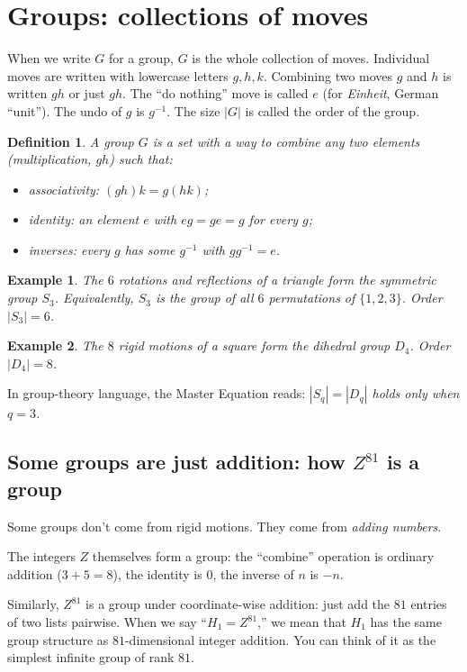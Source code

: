 \documentclass[11pt]{article}
\def\mathbb#1{#1}%
\def\textbf#1{#1}%
\def\cdot{ }%
\newtheorem*{definition}{Definition}
\newtheorem*{example}{Example}
\begin{document}
\section{Groups: collections of moves}

\begin{mathnote}
When we write $G$ for a group, $G$ is the whole collection of moves. Individual moves are written with lowercase letters $g, h, k$. Combining two moves $g$ and $h$ is written $g \cdot h$ or just $gh$. The ``do nothing'' move is called $e$ (for \emph{Einheit}, German ``unit''). The undo of $g$ is $g^{-1}$. The size $|G|$ is called the \textbf{order} of the group.
\end{mathnote}

\begin{definition}
A \textbf{group} $G$ is a set with a way to combine any two elements (multiplication, $gh$) such that:
\begin{itemize}[leftmargin=2em]
\item associativity: $(gh)k = g(hk)$;
\item identity: an element $e$ with $eg = ge = g$ for every $g$;
\item inverses: every $g$ has some $g^{-1}$ with $g g^{-1} = e$.
\end{itemize}
\end{definition}

\begin{example}
The $6$ rotations and reflections of a triangle form the \textbf{symmetric group} $S_3$. Equivalently, $S_3$ is the group of all $6$ permutations of $\{1,2,3\}$. Order $|S_3| = 6$.
\end{example}

\begin{example}
The $8$ rigid motions of a square form the \textbf{dihedral group} $D_4$. Order $|D_4| = 8$.
\end{example}

In group-theory language, the Master Equation reads: \emph{$|S_q| = |D_q|$ holds only when $q = 3$.}

\subsection*{Some groups are just addition: how $\mathbb{Z}^{81}$ is a group}

\begin{mathnote}
Some groups don't come from rigid motions. They come from \emph{adding numbers}.

The integers $\mathbb{Z}$ themselves form a group: the ``combine'' operation is ordinary addition ($3 + 5 = 8$), the identity is $0$, the inverse of $n$ is $-n$.

Similarly, $\mathbb{Z}^{81}$ is a group under coordinate-wise addition: just add the $81$ entries of two lists pairwise. When we say ``$H_1 = \mathbb{Z}^{81}$,'' we mean that $H_1$ has the same group structure as $81$-dimensional integer addition. You can think of it as the simplest infinite group of rank $81$.
\end{mathnote}
\end{document}
